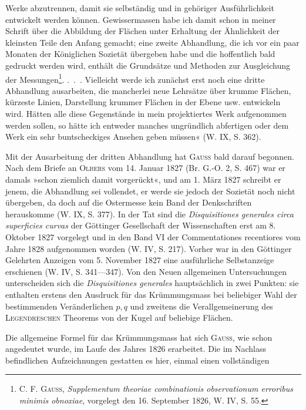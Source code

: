 Werke abzutrennen, damit sie selbständig und in gehöriger Ausführlichkeit
entwickelt werden können. Gewissermassen habe ich damit schon in meiner
Schrift über die Abbildung der Flächen unter Erhaltung der Ähnlichkeit der
kleinsten Teile den Anfang gemacht; eine zweite Abhandlung, die ich vor
ein paar Monaten der Königlichen Sozietät übergeben habe und die hoffentlich
bald gedruckt werden wird, enthält die Grundsätze und Methoden zur
Ausgleichung der Messungen\footnote{\textsc{C. F. Gauss}, \textit{Supplementum theoriae combinationis observationum erroribus minimis obnoxiae}, vorgelegt den 16. September 1826, W. IV, S. 55.}. .\ .\ . Vielleicht werde ich zunächst erst noch
eine dritte Abhandlung ausarbeiten, die mancherlei neue Lehrsätze über
krumme Flächen, kürzeste Linien, Darstellung krummer Flächen in der Ebene
usw. entwickeln wird. Hätten alle diese Gegenstände in mein projektiertes
Werk aufgenommen werden sollen, so hätte ich entweder manches ungründlich
abfertigen oder dem Werk ein sehr buntscheckiges Ansehen geben müssen«
(W. IX, S. 362).
\par
Mit der Ausarbeitung der dritten Abhandlung hat \textsc{Gauss} bald darauf begonnen.
Nach dem Briefe an \textsc{Olbers} vom 14. Januar 1827 (Br. G.-O. 2,
S. 467) war er damals »schon ziemlich damit vorgerückt«, und am 1. März 1827
schreibt er jenem, die Abhandlung sei vollendet, er werde sie jedoch der
Sozietät noch nicht übergeben, da doch auf die Ostermesse kein Band der
Denkschriften herauskomme (W. IX, S. 377). In der Tat sind die \textit{Disquisitiones
generales circa superficies curvas} der Göttinger Gesellschaft der Wissenschaften
erst am 8. Oktober 1827 vorgelegt und in den Band VI der Commentationes
recentiores vom Jahre 1828 aufgenommen worden (W. IV, S. 217).
Vorher war in den Göttinger Gelehrten Anzeigen vom 5. November 1827 eine
ausführliche Selbstanzeige erschienen (W. IV, S. 341—347).
\clearpage{}\setcounter{footnote}{0}
\indent Von den Neuen allgemeinen Untersuchungen unterscheiden sich die \textit{Disquisitiones
generales} hauptsächlich in zwei Punkten: sie enthalten erstens den
Ausdruck für das Krümmungsmass bei beliebiger Wahl der bestimmenden
Veränderlichen \(p,q\) und zweitens die Verallgemeinerung des \textsc{Legendreschen}
Theorems von der Kugel auf beliebige Flächen.
\par
Die allgemeine Formel für das Krümmungsmass hat sich \textsc{Gauss}, wie
schon angedeutet wurde, im Laufe des Jahres 1826 erarbeitet. Die im Nachlass
befindlichen Aufzeichnungen gestatten es hier, einmal einen vollständigen
